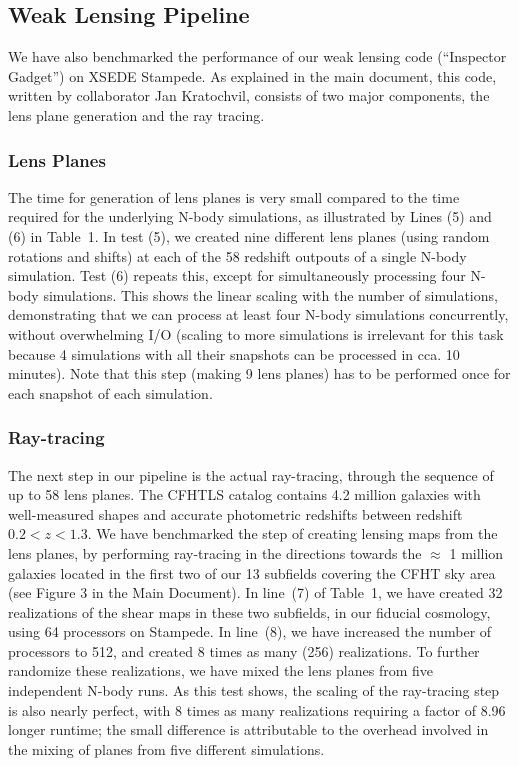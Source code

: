 \documentclass[10pt, preprint]{aastex}
\begin{document}
\subsection{Weak Lensing Pipeline}

We have also benchmarked the performance of our weak lensing code
(``Inspector Gadget'') on XSEDE Stampede. As explained in the main
document, this code, written by collaborator Jan Kratochvil, consists
of two major components, the lens plane generation and the ray
tracing.

\subsubsection{Lens Planes}

The time for generation of lens planes is very small compared to the
time required for the underlying N-body simulations, as illustrated by
Lines (5) and (6) in Table~1. In test (5), we created nine different
lens planes (using random rotations and shifts) at each of the 58
redshift outpouts of a single N-body simulation. Test (6) repeats
this, except for simultaneously processing four N-body
simulations. This shows the linear scaling with the number of
simulations, demonstrating that we can process at least four N-body
simulations concurrently, without overwhelming I/O (scaling to more
simulations is irrelevant for this task because 4 simulations with all
their snapshots can be processed in cca. 10 minutes).  Note that this
step (making 9 lens planes) has to be performed once for each snapshot
of each simulation.

\subsubsection{Ray-tracing}

The next step in our pipeline is the actual ray-tracing, through the
sequence of up to 58 lens planes.  The CFHTLS catalog contains 4.2
million galaxies with well-measured shapes and accurate photometric
redshifts between redshift $0.2 < z < 1.3$.  We have benchmarked the
step of creating lensing maps from the lens planes, by performing
ray-tracing in the directions towards the $\approx$ 1 million galaxies
located in the first two of our 13 subfields covering the CFHT sky
area (see Figure 3 in the Main Document).  In line~(7) of Table~1, we
have created 32 realizations of the shear maps in these two subfields,
in our fiducial cosmology, using 64 processors on Stampede.  In
line~(8), we have increased the number of processors to 512, and
created 8 times as many (256) realizations.  To further randomize
these realizations, we have mixed the lens planes from five
independent N-body runs.  As this test shows, the scaling of the
ray-tracing step is also nearly perfect, with 8 times as many
realizations requiring a factor of 8.96 longer runtime; the small
difference is attributable to the overhead involved in the mixing of
planes from five different simulations.
\end{document}
